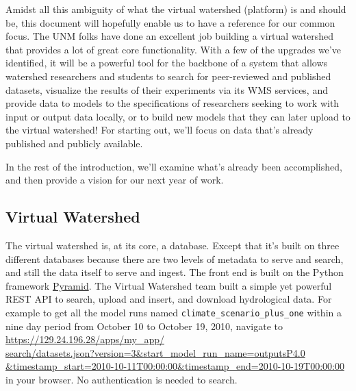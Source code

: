 \documentclass[
11pt, %
a4paper, %
oneside, %
twoside, %
headinclude,footinclude, %
BCOR5mm, %
]{scrartcl}
\begin{document}
Amidst all this ambiguity of what the virtual watershed (platform) is and should be, 
this document will hopefully enable us to have a reference for our common focus. The UNM folks have
done an excellent job building a virtual watershed that provides a lot of great core functionality.
With a few of the upgrades we've identified, it will be a powerful tool for the backbone of a system
that allows watershed researchers and students to search for peer-reviewed and published datasets,
visualize the results of their experiments via its WMS services, and provide data to models to the
specifications of researchers seeking to work with input or output data locally, or to build new 
models that they can later upload to the virtual watershed! For starting out, we'll focus on 
data that's already published and publicly available. 

In the rest of the introduction, we'll examine what's already been accomplished, and then provide
a vision for our next year of work. 

\subsection{Virtual Watershed} %
\label{sub:vw}

The virtual watershed is, at its core, a database. Except that it's built on three different
databases because there are two levels of metadata to serve and search, and still the data itself
to serve and ingest. The front end is built on the Python framework \href{http://www.pylonsproject.org/}{Pyramid}.
The Virtual Watershed team built a simple yet powerful REST API to search, upload and insert, and download
hydrological data. For example to get all the model runs named \texttt{climate\_scenario\_plus\_one} within
a nine day period from October 10 to October 19, 2010, 
navigate to 
\href{https://129.24.196.28/apps/my\_app/search/datasets.json?version=3\&start\_model\_run\_name=outputsP4.0\&timestamp\_start=2010-10-11T00:00:00\&timestamp\_end=2010-10-19T00:00:00}{https://129.24.196.28/apps/my\_app/\\search/datasets.json?version=3\&start\_model\_run\_name=outputsP4.0 \\ \&timestamp\_start=2010-10-11T00:00:00\&timestamp\_end=2010-10-19T00:00:00} 
in your browser. No authentication is needed to search.
\end{document}
